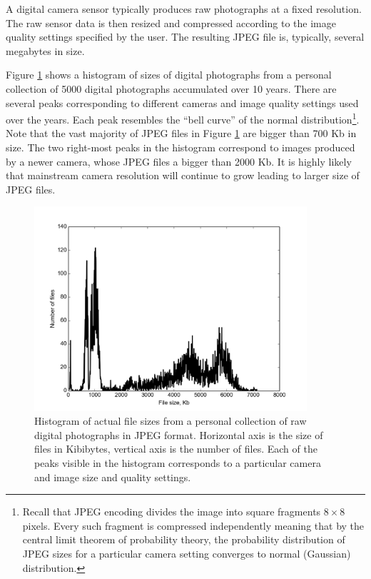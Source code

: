\documentclass[final,5p,times,twocolumn,authoryear]{elsarticle}
\begin{document}
A digital camera sensor typically produces raw photographs at a fixed resolution. The raw sensor data is then resized and compressed according to the image quality settings specified by the user. The resulting JPEG file is, typically, several megabytes in size. 

Figure \ref{fig:jpeg-dist} shows a histogram of sizes of digital photographs from a personal collection of 5000 digital photographs accumulated over 10 years. There are several peaks corresponding to different cameras and image quality settings used over the years. Each peak resembles the ``bell curve'' of the normal distribution\footnote{Recall that JPEG encoding divides the image into square fragments $8 \times 8$ pixels. Every such fragment is compressed independently meaning that by the central limit theorem of probability theory, the probability distribution of JPEG sizes for a particular camera setting converges to normal (Gaussian) distribution.}. Note that the vast majority of JPEG files in Figure \ref{fig:jpeg-dist} are bigger than 700 Kb in size. The two right-most peaks in the histogram correspond to images produced by a newer camera, whose JPEG files a bigger than 2000 Kb. It is highly likely that mainstream camera resolution will continue to grow leading to larger size of JPEG files. 

\begin{figure}
  \centerline{\includegraphics[width=0.9\textwidth]{figures/jpeg-sizes}}
  \caption{Histogram of actual file sizes from a personal collection of raw digital photographs in JPEG format. Horizontal axis is the size of files in Kibibytes, vertical axis is the number of files. Each of the peaks visible in the histogram corresponds to a particular camera and image size and quality settings.}
  \label{fig:jpeg-dist}
\end{figure}
\end{document}
